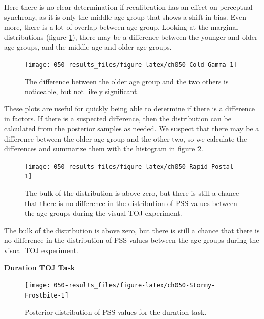 \documentclass[11pt, oneside, openany]{scrbook}
\begin{document}
Here there is no clear determination if recalibration has an effect on perceptual synchrony, as it is only the middle age group that shows a shift in bias. Even more, there is a lot of overlap between age group. Looking at the marginal distributions (figure \ref{fig:ch050-Cold-Gamma}), there may be a difference between the younger and older age groups, and the middle age and older age groups.

\begin{figure}

{\centering \texttt{[image: 050-results\_files/figure-latex/ch050-Cold-Gamma-1]} 

}

\caption{The difference between the older age group and the two others is noticeable, but not likely significant.}\label{fig:ch050-Cold-Gamma}
\end{figure}

These plots are useful for quickly being able to determine if there is a difference in factors. If there is a suspected difference, then the distribution can be calculated from the posterior samples as needed. We suspect that there may be a difference between the older age group and the other two, so we calculate the differences and summarize them with the histogram in figure \ref{fig:ch050-Rapid-Postal}.

\begin{figure}

{\centering \texttt{[image: 050-results\_files/figure-latex/ch050-Rapid-Postal-1]} 

}

\caption{The bulk of the distribution is above zero, but there is still a chance that there is no difference in the distribution of PSS values between the age groups during the visual TOJ experiment.}\label{fig:ch050-Rapid-Postal}
\end{figure}

The bulk of the distribution is above zero, but there is still a chance that there is no difference in the distribution of PSS values between the age groups during the visual TOJ experiment.

\textbf{Duration TOJ Task}

\begin{figure}

{\centering \texttt{[image: 050-results\_files/figure-latex/ch050-Stormy-Frostbite-1]} 

}

\caption{Posterior distribution of PSS values for the duration task.}\label{fig:ch050-Stormy-Frostbite}
\end{figure}
\end{document}
